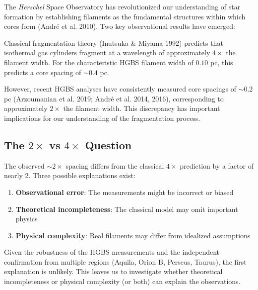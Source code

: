 \documentclass[11pt,a4paper]{article}
\begin{document}
The \textit{Herschel} Space Observatory has revolutionized our understanding of star formation by establishing filaments as the fundamental structures within which cores form (Andr\'e et al. 2010). Two key observational results have emerged:


Classical fragmentation theory (Inutsuka \& Miyama 1992) predicts that isothermal gas cylinders fragment at a wavelength of approximately $4\times$ the filament width. For the characteristic HGBS filament width of $0.10$ pc, this predicts a core spacing of $\sim0.4$ pc.

However, recent HGBS analyses have consistently measured core spacings of $\sim0.2$ pc (Arzoumanian et al. 2019; Andr\'e et al. 2014, 2016), corresponding to approximately $2\times$ the filament width. This discrepancy has important implications for our understanding of the fragmentation process.

\subsection{The $2\times$ vs $4\times$ Question}

The observed $\sim2\times$ spacing differs from the classical $4\times$ prediction by a factor of nearly 2. Three possible explanations exist:

\begin{enumerate}
    \item \textbf{Observational error}: The measurements might be incorrect or biased
    \item \textbf{Theoretical incompleteness}: The classical model may omit important physics
    \item \textbf{Physical complexity}: Real filaments may differ from idealized assumptions
\end{enumerate}

Given the robustness of the HGBS measurements and the independent confirmation from multiple regions (Aquila, Orion B, Perseus, Taurus), the first explanation is unlikely. This leaves us to investigate whether theoretical incompleteness or physical complexity (or both) can explain the observations.
\end{document}
